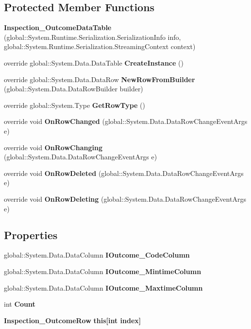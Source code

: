 \subsection*{Protected Member Functions}
\begin{DoxyCompactItemize}
\item 
\textbf{ Inspection\+\_\+\+Outcome\+Data\+Table} (global\+::\+System.\+Runtime.\+Serialization.\+Serialization\+Info info, global\+::\+System.\+Runtime.\+Serialization.\+Streaming\+Context context)
\item 
override global\+::\+System.\+Data.\+Data\+Table \textbf{ Create\+Instance} ()
\item 
override global\+::\+System.\+Data.\+Data\+Row \textbf{ New\+Row\+From\+Builder} (global\+::\+System.\+Data.\+Data\+Row\+Builder builder)
\item 
override global\+::\+System.\+Type \textbf{ Get\+Row\+Type} ()
\item 
override void \textbf{ On\+Row\+Changed} (global\+::\+System.\+Data.\+Data\+Row\+Change\+Event\+Args e)
\item 
override void \textbf{ On\+Row\+Changing} (global\+::\+System.\+Data.\+Data\+Row\+Change\+Event\+Args e)
\item 
override void \textbf{ On\+Row\+Deleted} (global\+::\+System.\+Data.\+Data\+Row\+Change\+Event\+Args e)
\item 
override void \textbf{ On\+Row\+Deleting} (global\+::\+System.\+Data.\+Data\+Row\+Change\+Event\+Args e)
\end{DoxyCompactItemize}
\subsection*{Properties}
\begin{DoxyCompactItemize}
\item 
global\+::\+System.\+Data.\+Data\+Column \textbf{ I\+Outcome\+\_\+\+Code\+Column}\hspace{0.3cm}{\ttfamily  [get]}
\item 
global\+::\+System.\+Data.\+Data\+Column \textbf{ I\+Outcome\+\_\+\+Mintime\+Column}\hspace{0.3cm}{\ttfamily  [get]}
\item 
global\+::\+System.\+Data.\+Data\+Column \textbf{ I\+Outcome\+\_\+\+Maxtime\+Column}\hspace{0.3cm}{\ttfamily  [get]}
\item 
int \textbf{ Count}\hspace{0.3cm}{\ttfamily  [get]}
\item 
\textbf{ Inspection\+\_\+\+Outcome\+Row} \textbf{ this[int index]}\hspace{0.3cm}{\ttfamily  [get]}
\end{DoxyCompactItemize}
